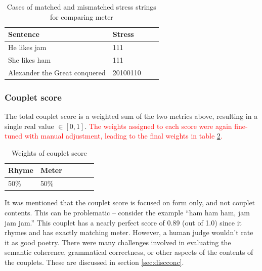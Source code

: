 \documentclass[11pt,a4paper]{article}
\begin{document}
\begin{table}
\centering
\begin{tabular}{ll c c}
	\hline\hline
	Sentence & Stress \\ [0.5ex]
	\hline\hline
	He likes jam & 111 \\ [0.5ex]
	\hline
	She likes ham & 111 \\ [0.5ex]
	\hline
	Alexander the Great conquered & 20100110 \\ [0.5ex]
	\hline
\end{tabular}
\caption{Cases of matched and mismatched stress strings for comparing meter}
\label{table:stress}
\end{table}

\subsubsection{Couplet score}
\label{sec:coupletscore}

The total couplet score is a weighted sum of the two metrics above, resulting in a single real value $\in [0, 1]$. \textcolor{red}{The weights assigned to each score were again fine-tuned with manual adjustment, leading to the final weights in table \ref{table:weight_couplet_score}.}

\begin{table}[ht]
\centering
\begin{tabular}{lll c c c}
	\hline\hline
	Rhyme & Meter \\ [0.5ex]
	\hline\hline
	50\% & 50\% \\ [0.5ex]
	\hline
\end{tabular}
\caption{Weights of couplet score}
\label{table:weight_couplet_score}
\end{table}

It was mentioned that the couplet score is focused on form only, and not couplet contents. This can be problematic -- consider the example ``ham ham ham, jam jam jam.'' This couplet has a nearly perfect score of 0.89 (out of 1.0) since it rhymes and has exactly matching meter. However, a human judge wouldn't rate it as good poetry. There were many challenges involved in evaluating the semantic coherence, grammatical correctness, or other aspects of the contents of the couplets. These are discussed in section \ref{sec:discconc}.
\end{document}
